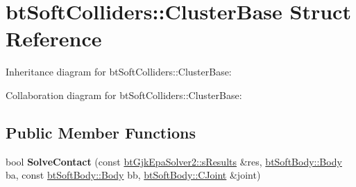\hypertarget{structbt_soft_colliders_1_1_cluster_base}{\section{bt\+Soft\+Colliders\+:\+:Cluster\+Base Struct Reference}
\label{structbt_soft_colliders_1_1_cluster_base}
}


Inheritance diagram for bt\+Soft\+Colliders\+:\+:Cluster\+Base\+:


Collaboration diagram for bt\+Soft\+Colliders\+:\+:Cluster\+Base\+:
\subsection*{Public Member Functions}
\begin{DoxyCompactItemize}
\item 
\hypertarget{structbt_soft_colliders_1_1_cluster_base_ab26446fdc6789ceb6cd62026286ffe48}{bool {\bfseries Solve\+Contact} (const \hyperlink{structbt_gjk_epa_solver2_1_1s_results}{bt\+Gjk\+Epa\+Solver2\+::s\+Results} \&res, \hyperlink{structbt_soft_body_1_1_body}{bt\+Soft\+Body\+::\+Body} ba, const \hyperlink{structbt_soft_body_1_1_body}{bt\+Soft\+Body\+::\+Body} bb, \hyperlink{structbt_soft_body_1_1_c_joint}{bt\+Soft\+Body\+::\+C\+Joint} \&joint)}\label{structbt_soft_colliders_1_1_cluster_base_ab26446fdc6789ceb6cd62026286ffe48}

\end{DoxyCompactItemize}
